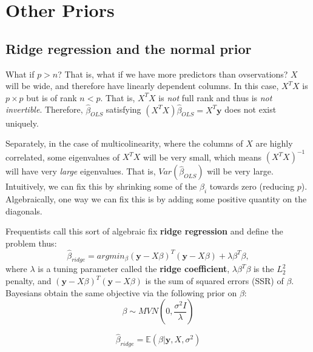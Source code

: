 \documentclass[titlepage, 12pt, leqno]{article}
\begin{document}
\pagebreak
\section{Other Priors}
\subsection{Ridge regression and the normal prior}
What if $p>n$? That is, what if we have more predictors than ovservations? $X$
will be wide, and therefore have linearly dependent columns. In this case,
$X^{T}X$ is $p \times p$ but is of rank $n<p$. That is, $X^{T}X$ is \textit{not}
full rank and thus is \textit{not invertible}. Therefore, $\hat \beta_{OLS}$
satisfying $(X^{T}X)\hat \beta_{OLS}=X^{T}\textbf{y}$ does not exist uniquely.

Separately, in the case of multicolinearity, where the columns of $X$ are highly
correlated, some eigenvalues of $X^{T}X$ will be very small, which means
$(X^{T}X)^{-1}$ will have very \textit{large} eigenvalues. That is,
$Var(\hat \beta_{OLS})$ will be very large. Intuitively, we can fix this by
shrinking some of the $\beta_{i}$ towards zero (reducing $p$). Algebraically,
one way we can fix this is by adding some positive quantity on the diagonals.

Frequentists call this sort of algebraic fix \textbf{ridge regression} and
define the problem thus:
\[
\hat \beta_{ridge} = argmin_{\beta}(\textbf{y}-X\beta)^{T}(\textbf{y}-X\beta) +
\lambda\beta^{T}\beta,
\]
where $\lambda$ is a tuning parameter called the \textbf{ridge coefficient},
$\lambda\beta^{T}\beta$ is the $L_{2}^{2}$ penalty, and $(\textbf{y}-X\beta)^{T}
(\textbf{y}-X\beta)$ is the sum of squared errors (SSR) of $\beta$.
Bayesians obtain the same objective via the following prior on $\beta$:
\[
\beta \sim MVN\left(0, \frac{\sigma^{2}I}{\lambda}\right)
\]

\begin{note}
    \[
    \hat \beta_{ridge} = \mathbb{E}(\beta|\textbf{y},X,\sigma^{2})
    \]
\end{note}
\end{document}
